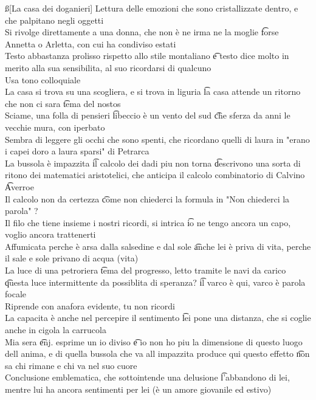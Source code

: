 \documentclass[12pt]{article}
\begin{document}
\ss[La casa dei doganieri]
Lettura delle emozioni che sono cristallizzate dentro, e che palpitano negli oggetti \\
Si rivolge direttamente a una donna, che non è ne irma ne la moglie \t forse Annetta o Arletta, con cui ha condiviso estati \\
Testo abbastanza prolisso rispetto allo stile montaliano \t e testo dice molto in merito alla sua sensibilita, al suo ricordarsi di qualcuno \\
Usa tono colloquiale \\
La casa si trova su una scogliera, e si trova in liguria \t la casa attende un ritorno che non ci sara \t tema del nostos \\
Sciame, una folla di pensieri \t libeccio è un vento del sud \t che sferza da anni le vecchie mura, con iperbato \\
Sembra di leggere gli occhi che sono spenti, che ricordano quelli di laura in "erano i capei doro a laura sparsi" di Petrarca \\
La bussola è impazzita \t il calcolo dei dadi piu non torna \t descrivono una sorta di ritono dei matematici aristotelici, che anticipa il calcolo combinatorio di Calvino \t Averroe \\
Il calcolo non da certezza \t come non chiederci la formula in "Non chiederci la parola" ? \\
Il filo che tiene insieme i nostri ricordi, si intrica \t io ne tengo ancora un capo, voglio ancora trattenerti \\
Affumicata perche è arsa dalla salsedine e dal sole \t anche lei è priva di vita, perche il sale e sole privano di acqua (vita) \\
La luce di una petroriera \t tema del progresso, letto tramite le navi da carico \t questa luce intermittente da possiblita di speranza? \t il varco è qui, varco è parola focale \\
Riprende con anafora evidente, tu non ricordi \\
La capacita è anche nel percepire il sentimento \t lei pone una distanza, che si coglie anche in cigola la carrucola \\
Mia sera \t enj. esprime un io diviso \t e io non ho piu la dimensione di questo luogo dell anima, e di quella bussola che va all impazzita produce qui questo effetto \t non sa chi rimane e chi va nel suo cuore \\
Conclusione emblematica, che sottointende una delusione \t l'abbandono di lei, mentre lui ha ancora sentimenti per lei (è un amore giovanile ed estivo)
\end{document}
